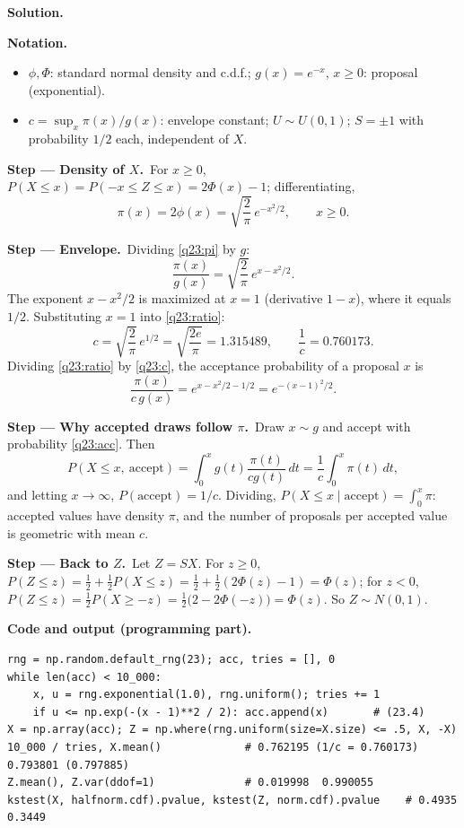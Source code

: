 \documentclass[11pt,a4paper]{article}
\numberwithin{equation}{questao}   %
\newenvironment{notacao}{\par\smallskip\noindent\textbf{Notation.}\begin{itemize}[leftmargin=1.4em,topsep=1pt,itemsep=0pt]\small}{\end{itemize}}
\newcommand{\passo}[2]{\par\smallskip\noindent\textbf{Step --- #1.}~#2}
\newcommand{\solhead}{\par\medskip\noindent{\color{blue!55!black}\rule{\linewidth}{0.3pt}}\par\noindent\textbf{Solution.}}
\newcommand{\codehead}{\par\smallskip\noindent\textbf{Code and output (programming part).}\par}
\newcommand{\1}{\mathbf{1}}
\begin{document}
\begin{sol}
\solhead
\begin{notacao}
\item $\phi,\Phi$: standard normal density and c.d.f.; $g(x)=e^{-x}$, $x\ge0$: proposal (exponential).
\item $c=\sup_x\pi(x)/g(x)$: envelope constant; $U\sim U(0,1)$; $S=\pm1$ with probability $1/2$ each, independent of $X$.
\end{notacao}

\passo{Density of $X$}{For $x\ge0$, $P(X\le x)=P(-x\le Z\le x)=2\Phi(x)-1$; differentiating,}
\begin{equation}\label{q23:pi}
\pi(x)=2\phi(x)=\sqrt{\frac2\pi}\,e^{-x^2/2},\qquad x\ge0 .
\end{equation}

\passo{Envelope}{Dividing \eqref{q23:pi} by $g$:}
\begin{equation}\label{q23:ratio}
\frac{\pi(x)}{g(x)}=\sqrt{\frac2\pi}\,e^{x-x^2/2}.
\end{equation}
The exponent $x-x^2/2$ is maximized at $x=1$ (derivative $1-x$), where it equals $1/2$. Substituting
$x=1$ into \eqref{q23:ratio}:
\begin{equation}\label{q23:c}
c=\sqrt{\frac2\pi}\,e^{1/2}=\sqrt{\frac{2e}{\pi}}=1.315489,\qquad \frac1c=0.760173 .
\end{equation}
Dividing \eqref{q23:ratio} by \eqref{q23:c}, the acceptance probability of a proposal $x$ is
\begin{equation}\label{q23:acc}
\frac{\pi(x)}{c\,g(x)}=e^{x-x^2/2-1/2}=e^{-(x-1)^2/2}.
\end{equation}

\passo{Why accepted draws follow $\pi$}{Draw $x\sim g$ and accept with probability \eqref{q23:acc}.
Then}
\[
P(X\le x,\ \text{accept})=\int_0^xg(t)\frac{\pi(t)}{cg(t)}\,dt=\frac1c\int_0^x\pi(t)\,dt,
\]
and letting $x\to\infty$, $P(\text{accept})=1/c$. Dividing, $P(X\le x\mid\text{accept})=\int_0^x\pi$:
accepted values have density $\pi$, and the number of proposals per accepted value is geometric
with mean $c$.

\passo{Back to $Z$}{Let $Z=SX$. For $z\ge0$, $P(Z\le z)=\frac12+\frac12P(X\le z)=\frac12+\frac12(2\Phi(z)-1)=\Phi(z)$;
for $z<0$, $P(Z\le z)=\frac12P(X\ge-z)=\frac12\big(2-2\Phi(-z)\big)=\Phi(z)$. So $Z\sim N(0,1)$.}

\codehead
{\small
\begin{verbatim}
rng = np.random.default_rng(23); acc, tries = [], 0
while len(acc) < 10_000:
    x, u = rng.exponential(1.0), rng.uniform(); tries += 1
    if u <= np.exp(-(x - 1)**2 / 2): acc.append(x)       # (23.4)
X = np.array(acc); Z = np.where(rng.uniform(size=X.size) <= .5, X, -X)
10_000 / tries, X.mean()             # 0.762195 (1/c = 0.760173)  0.793801 (0.797885)
Z.mean(), Z.var(ddof=1)              # 0.019998  0.990055
kstest(X, halfnorm.cdf).pvalue, kstest(Z, norm.cdf).pvalue    # 0.4935  0.3449
\end{verbatim}
}


\end{sol}
\end{document}
